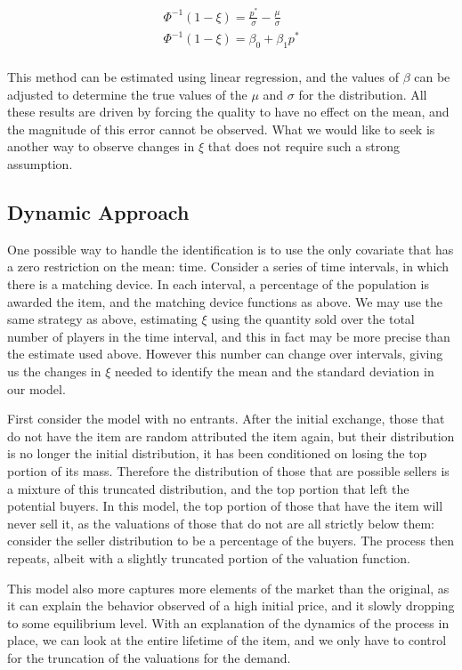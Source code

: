 \documentclass[12pt, letterpaper]{paper}
\begin{document}
\begin{align*}
\Phi^{-1} ( 1- \xi ) = \frac{p^*}{\sigma} - \frac{\mu}{\sigma} \\
\Phi^{-1} ( 1- \xi ) = \beta_0 + \beta_1 p^* \\
\end{align*}

This method can be estimated using linear regression, and the values
of $\beta$ can be adjusted to determine the true values of the $\mu$ and $\sigma$ for
the distribution. All these results are driven by forcing the
quality to have no effect on the mean, and the magnitude of this error
cannot be observed. What we would like to seek is another way to
observe changes in $\xi$ that does not require such a strong assumption.

\subsection{Dynamic Approach}
\label{sec-2-3}
One possible way to handle the identification is to use the only
covariate that has a zero restriction on the mean: time. Consider a
series of time intervals, in which there is a matching device. In each
interval, a percentage of the population is awarded the item, and the
matching device functions as above. We may use the same strategy as
above, estimating $\xi$ using the quantity sold over the total number of
players in the time interval, and this in fact may be more precise
than the estimate used above. However this number can change over
intervals, giving us the changes in $\xi$ needed to identify the mean and
the standard deviation in our model.

First consider the model with no entrants. After the initial
exchange, those that do not have the item are random attributed the
item again, but their distribution is no longer the initial
distribution, it has been conditioned on losing the top portion of its
mass. Therefore the distribution of those that are possible sellers is
a mixture of this truncated distribution, and the top portion that
left the potential buyers. In this model, the top portion of
those that have the item will never sell it, as the valuations of
those that do not are all strictly below them: consider the
seller distribution to be a percentage of the buyers. The process then
repeats, albeit with a slightly truncated portion of the valuation
function. 

This model also more captures more elements of the market than the
original, as it can explain the behavior observed of a high initial
price, and it slowly dropping to some equilibrium level. With an
explanation of the dynamics of the process in place, we can look at
the entire lifetime of the item, and we only have to control for the
truncation of the valuations for the demand. 
\end{document}
